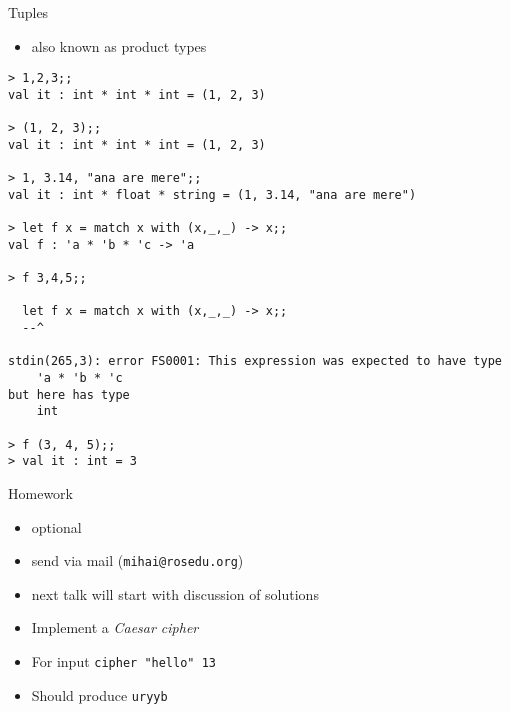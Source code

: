 \documentclass{beamer}
\begin{document}
\begin{frame}[fragile]{Tuples}
  \begin{itemize}
    \item also known as product types
  \end{itemize}
\tiny{
  \begin{verbatim}
> 1,2,3;;
val it : int * int * int = (1, 2, 3)

> (1, 2, 3);;
val it : int * int * int = (1, 2, 3)

> 1, 3.14, "ana are mere";;
val it : int * float * string = (1, 3.14, "ana are mere")

> let f x = match x with (x,_,_) -> x;;
val f : 'a * 'b * 'c -> 'a

> f 3,4,5;;

  let f x = match x with (x,_,_) -> x;;
  --^

stdin(265,3): error FS0001: This expression was expected to have type
    'a * 'b * 'c    
but here has type
    int

> f (3, 4, 5);;
> val it : int = 3
  \end{verbatim}
}
\end{frame}

\begin{frame}[fragile]{Homework}
  \begin{itemize}
    \item optional
    \item send via mail (\texttt{mihai@rosedu.org})
    \item next talk will start with discussion of solutions
  \end{itemize}
  \pause
  \begin{itemize}
    \item Implement a \textit{Caesar cipher}
    \item For input \texttt{cipher "hello" 13}
    \item Should produce \texttt{uryyb}
  \end{itemize}
\end{frame}
\end{document}
